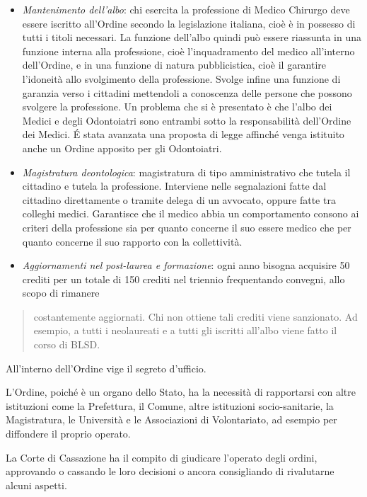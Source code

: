 \documentclass[]{article}
\begin{document}
\begin{itemize}
\item
  \emph{Mantenimento dell'albo}: chi esercita la professione di Medico
  Chirurgo deve essere iscritto all'Ordine secondo la legislazione
  italiana, cioè è in possesso di tutti i titoli necessari. La funzione
  dell'albo quindi può essere riassunta in una funzione interna alla
  professione, cioè l'inquadramento del medico all'interno dell'Ordine,
  e in una funzione di natura pubblicistica, cioè il garantire
  l'idoneità allo svolgimento della professione. Svolge infine una
  funzione di garanzia verso i cittadini mettendoli a conoscenza delle
  persone che possono svolgere la professione. Un problema che si è
  presentato è che l'albo dei Medici e degli Odontoiatri sono entrambi
  sotto la responsabilità dell'Ordine dei Medici. É stata avanzata una
  proposta di legge affinché venga istituito anche un Ordine apposito
  per gli Odontoiatri.
\item
  \emph{Magistratura deontologica}: magistratura di tipo amministrativo
  che tutela il cittadino e tutela la professione. Interviene nelle
  segnalazioni fatte dal cittadino direttamente o tramite delega di un
  avvocato, oppure fatte tra colleghi medici. Garantisce che il medico
  abbia un comportamento consono ai criteri della professione sia per
  quanto concerne il suo essere medico che per quanto concerne il suo
  rapporto con la collettività.
\item
  \emph{Aggiornamenti nel post-laurea e formazione}: ogni anno bisogna
  acquisire 50 crediti per un totale di 150 crediti nel triennio
  frequentando convegni, allo scopo di rimanere
\end{itemize}

\begin{quote}
costantemente aggiornati. Chi non ottiene tali crediti viene sanzionato.
Ad esempio, a tutti i neolaureati e a tutti gli iscritti all'albo viene
fatto il corso di BLSD.
\end{quote}

All'interno dell'Ordine vige il segreto d'ufficio.

L'Ordine, poiché è un organo dello Stato, ha la necessità di rapportarsi
con altre istituzioni come la Prefettura, il Comune, altre istituzioni
socio-sanitarie, la Magistratura, le Università e le Associazioni di
Volontariato, ad esempio per diffondere il proprio operato.

La Corte di Cassazione ha il compito di giudicare l'operato degli
ordini, approvando o cassando le loro decisioni o ancora consigliando di
rivalutarne alcuni aspetti.
\end{document}
